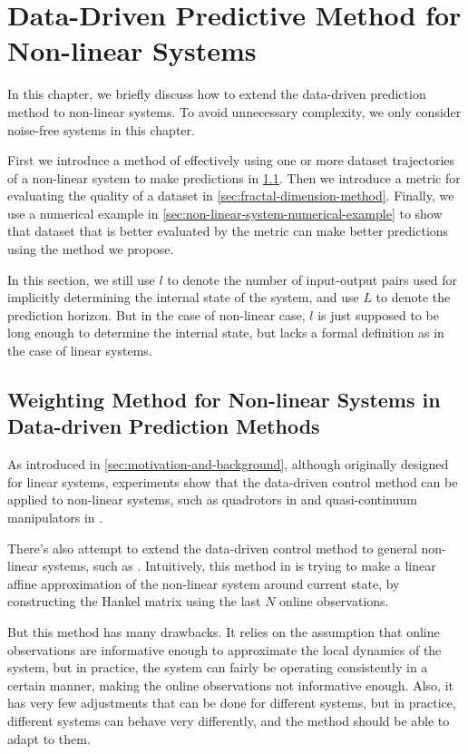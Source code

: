 \chapter{Data-Driven Predictive Method for Non-linear Systems}\label{chap:non-linear-system}

In this chapter, we briefly discuss how to extend the data-driven prediction method to non-linear systems.
To avoid unnecessary complexity, we only consider noise-free systems in this chapter.

First we introduce a method of effectively using one or more dataset trajectories of a non-linear system to make predictions in \cref{sec:weighting-method}.
Then we introduce a metric for evaluating the quality of a dataset in \cref{sec:fractal-dimension-method}.
Finally, we use a numerical example in \cref{sec:non-linear-system-numerical-example} to show that dataset that is better evaluated by the metric can make better predictions using the method we propose.

In this section, we still use $l$ to denote the number of input-output pairs used for implicitly determining the internal state of the system, and use $L$ to denote the prediction horizon.
But in the case of non-linear case, $l$ is just supposed to be long enough to determine the internal state, but lacks a formal definition as in the case of linear systems.


\section{Weighting Method for Non-linear Systems in Data-driven Prediction Methods}\label{sec:weighting-method}

As introduced in \cref{sec:motivation-and-background}, although originally designed for linear systems, experiments show that the data-driven control method can be applied to non-linear systems, such as quadrotors in \cite{elokdaDataQuad2021} and quasi-continuum manipulators in \cite{mullerDataDrivenQCR2022}.

There's also attempt to extend the data-driven control method to general non-linear systems, such as \cite{berberichLinearTrackingMPCData2022}.
Intuitively, this method in \cite{berberichLinearTrackingMPCData2022} is trying to make a linear affine approximation of the non-linear system around current state, by constructing the Hankel matrix using the last $N$ online observations.

But this method has many drawbacks.
It relies on the assumption that online observations are informative enough to approximate the local dynamics of the system, but in practice, the system can fairly be operating consistently in a certain manner, making the online observations not informative enough.
Also, it has very few adjustments that can be done for different systems, but in practice, different systems can behave very differently, and the method should be able to adapt to them.

